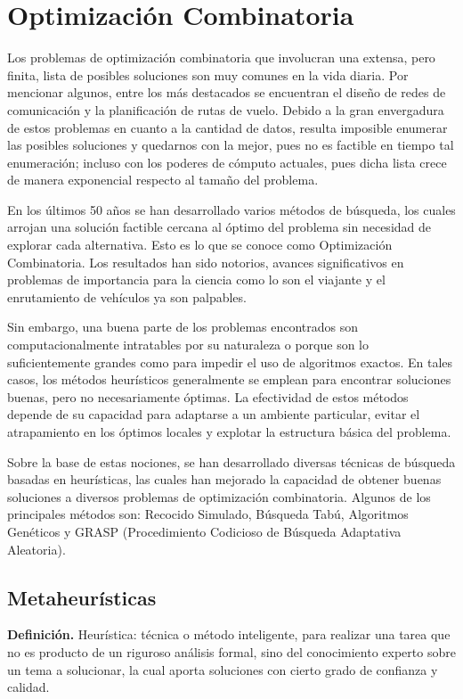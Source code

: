 \documentclass[a4paper,12pt]{book}
\begin{document}
\chapter{Optimización Combinatoria}
	Los problemas de optimización combinatoria que involucran una extensa, pero finita, lista de posibles soluciones son muy comunes en la vida diaria. Por mencionar algunos, entre los más destacados se encuentran el diseño de redes de comunicación y la planificación de rutas de vuelo. Debido a la gran envergadura de estos problemas en cuanto a la cantidad de datos, resulta imposible enumerar las posibles soluciones y quedarnos con la mejor, pues no es factible en tiempo tal enumeración; incluso con los poderes de cómputo actuales, pues dicha lista crece de manera exponencial respecto al tamaño del problema.
	
	En los últimos 50 años se han desarrollado varios métodos de búsqueda, los cuales arrojan una solución factible cercana al óptimo del problema sin necesidad de explorar cada alternativa. Esto es lo que se conoce como Optimización Combinatoria. Los resultados han sido notorios, avances significativos en problemas de importancia para la ciencia como lo son el viajante y el enrutamiento de vehículos ya son palpables.
	
	Sin embargo, una buena parte de los problemas encontrados son computacionalmente intratables por su naturaleza o porque son lo suficientemente grandes como para impedir el uso de algoritmos exactos. En tales casos, los métodos heurísticos generalmente se emplean para encontrar soluciones buenas, pero no necesariamente óptimas. La efectividad de estos métodos depende de su capacidad para adaptarse a un ambiente particular, evitar el atrapamiento en los óptimos locales y explotar la estructura básica del problema.
	
	Sobre la base de estas nociones, se han desarrollado diversas técnicas de búsqueda basadas en heurísticas, las cuales han mejorado la capacidad de obtener buenas soluciones a diversos problemas de optimización combinatoria. Algunos de los principales métodos son: Recocido Simulado, Búsqueda Tabú, Algoritmos Genéticos y GRASP (Procedimiento Codicioso de Búsqueda Adaptativa Aleatoria).
	
	\section{Metaheurísticas}
	
	\textbf{Definición.} Heurística: técnica o método inteligente, para realizar una tarea que no es producto de un riguroso análisis formal, sino del conocimiento experto sobre un tema a solucionar, la cual aporta soluciones con cierto grado de confianza y calidad. \\
	
\end{document}
